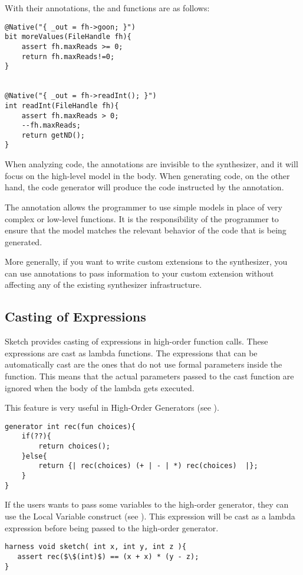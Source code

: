 \begin{Example}
With their annotations, the  and  functions are as follows:
\begin{lstlisting}
@Native("{ _out = fh->goon; }")
bit moreValues(FileHandle fh){
    assert fh.maxReads >= 0;
    return fh.maxReads!=0;
}


@Native("{ _out = fh->readInt(); }")
int readInt(FileHandle fh){
    assert fh.maxReads > 0;
    --fh.maxReads;
    return getND();
}
\end{lstlisting}

When analyzing code, the annotations are invisible to the synthesizer, and it will focus on the high-level model in the body. When generating code, on the other hand, the code generator will produce the code instructed by the  annotation.

\end{Example}

The  annotation allows the programmer to use simple models in place of very complex or low-level functions. It is the responsibility of the programmer to ensure that the model matches the relevant behavior of the code that is being generated.

More generally, if you want to write custom extensions to the \Sk{} synthesizer, you can use annotations to pass information to your custom extension without affecting any of the existing synthesizer infrastructure.

\subsection{Casting of Expressions}
Sketch provides casting of expressions in high-order function calls. These expressions are cast as lambda functions. The expressions that can be automatically cast are the ones that do not use formal parameters inside the function. This means that the actual parameters passed to the cast function are ignored when the body of the lambda gets executed.

This feature is very useful in High-Order Generators (see ).
\begin{lstlisting}
generator int rec(fun choices){
    if(??){
        return choices();
    }else{
        return {| rec(choices) (+ | - | *) rec(choices)  |};
    }
}
\end{lstlisting}

If the users wants to pass some variables to the high-order generator, they can use the Local Variable construct (see ). This expression will be cast as a lambda expression before being passed to the high-order generator.
\begin{lstlisting}
harness void sketch( int x, int y, int z ){
   assert rec($\$(int)$) == (x + x) * (y - z);
}
\end{lstlisting}
